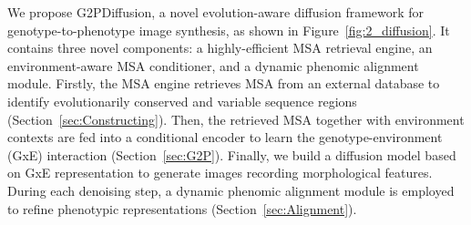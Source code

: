 We propose G2PDiffusion, a novel evolution-aware diffusion framework for genotype-to-phenotype image synthesis, as shown in Figure~\ref{fig:2_diffusion}.
It contains three novel components: a highly-efficient MSA retrieval engine, an environment-aware MSA conditioner, and a dynamic phenomic alignment module.
Firstly, the MSA engine retrieves MSA from an external database to identify evolutionarily conserved and variable sequence regions (Section~\ref{sec:Constructing}). Then, the retrieved MSA together with environment contexts are fed into a conditional encoder to learn the genotype-environment (GxE) interaction (Section~\ref{sec:G2P}). Finally, we build a diffusion model based on GxE representation to generate images recording morphological features. 
During each denoising step, a dynamic phenomic alignment module is employed to refine phenotypic representations
(Section~\ref{sec:Alignment}).

























